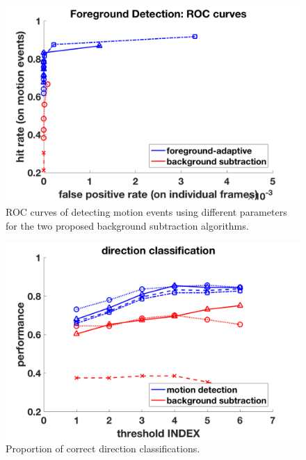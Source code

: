 \documentclass[12pt,oneside]{article} %
\begin{document}
\begin{figure}[htb]
\centering
\includegraphics[scale=0.52]{images/roc.png}
\caption{ROC curves of detecting motion events using different parameters for the two proposed
background subtraction algorithms.}
\label{roc}
\end{figure}

\begin{figure}[htb]
\centering
\includegraphics[scale=0.52]{images/dirClass.png}
\caption{Proportion of correct direction classifications.}
\label{dirclass}
\end{figure}
\end{document}
